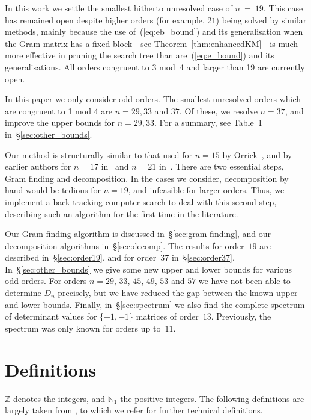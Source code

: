 \documentclass[11pt,a4paper]{article}
\newcommand{\nat}{\mathbb{N}_0}
\newcommand{\pos}{\mathbb{N}_1}
\newcommand{\integer}{\mathbb{Z}}
\begin{document}
In this work we settle the smallest hitherto unresolved case of $n~=~19$.
This case has remained open despite higher orders (for example, $21$) being
solved by similar methods, mainly because the use of~(\ref{eq:eb_bound}) and
its generalisation when the Gram matrix has a fixed block---see
Theorem~\ref{thm:enhancedKM}---is much more effective in pruning the search
tree than are~(\ref{eq:e_bound}) and its generalisations. All orders
congruent to 3 mod~4 and larger than 19 are currently open.

In this paper we only consider odd orders.
The smallest unresolved orders which are congruent to 1 mod 4 
are $n=29, 33$ and $37$.  Of these, we resolve $n=37$, and improve the
upper bounds for $n = 29, 33$.  
For a summary, see Table~1 in~\S\ref{sec:other_bounds}.

Our method is structurally similar to that used for $n = 15$ by
Orrick~\cite{Orrick05}, and by earlier authors for $n = 17$ in~\cite{MoKo82}
and $n = 21$ in~\cite{ChKoMo87}. There are two essential steps, Gram
finding and decomposition. In the cases we consider, decomposition by hand
would be tedious for $n = 19$, and infeasible for larger orders. Thus, we
implement a back-tracking computer search to deal with this second step,
describing such an algorithm for the first time in the literature.

Our Gram-finding algorithm is discussed in~\S\ref{sec:gram-finding},
and our decomposition algorithms in~\S\ref{sec:decomp}.
The results for order~$19$ are described in~\S\ref{sec:order19},
and for order~$37$ in~\S\ref{sec:order37}.
In~\S\ref{sec:other_bounds} we give some new upper and lower
bounds for various odd orders.  For
orders $n = 29$, $33$, $45$, $49$, $53$ and $57$ we have not been able to
determine $D_n$ precisely, but we have reduced the gap between the known
upper and lower bounds.
Finally, in~\S\ref{sec:spectrum} we also find the complete spectrum of 
determinant values for $\{+1,-1\}$ matrices of order~$13$.
Previously, the spectrum was only known for orders up to~$11$.

\section{Definitions}
  
$\integer$ denotes the integers,
and $\pos$ the positive integers.
The following definitions are largely taken from \cite{Orrick05}, to which
we refer for further technical definitions.
\end{document}
